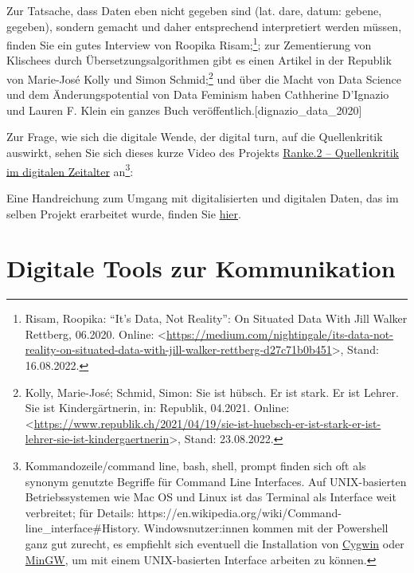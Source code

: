 \documentclass[
  letterpaper,
]{book}
\begin{document}
Zur Tatsache, dass Daten eben nicht gegeben sind (lat. dare, datum:
gebene, gegeben), sondern gemacht und daher entsprechend interpretiert
werden müssen, finden Sie ein gutes Interview von Roopika
Risam;\footnote{Risam, Roopika: {``}{It}{'}s {Data}, {Not}
  {Reality}{''}: {On} {Situated} {Data} {With} {Jill} {Walker}
  {Rettberg}, 06.2020. Online:
  \textless{}\url{https://medium.com/nightingale/its-data-not-reality-on-situated-data-with-jill-walker-rettberg-d27c71b0b451}\textgreater,
  Stand: 16.08.2022.}; zur Zementierung von Klischees durch
Übersetzungsalgorithmen gibt es einen Artikel in der Republik von
Marie-José Kolly und Simon Schmid;\footnote{Kolly, Marie-José; Schmid,
  Simon: Sie ist h{ü}bsch. {Er} ist stark. {Er} ist {Lehrer}. {Sie} ist
  {Kinderg{ä}rtnerin}, in: Republik, 04.2021. Online:
  \textless{}\url{https://www.republik.ch/2021/04/19/sie-ist-huebsch-er-ist-stark-er-ist-lehrer-sie-ist-kindergaertnerin}\textgreater,
  Stand: 23.08.2022.} und über die Macht von Data Science und dem
Änderungspotential von Data Feminism haben Cathherine D'Ignazio und
Lauren F. Klein ein ganzes Buch veröffentlich.{[}dignazio\_data\_2020{]}

Zur Frage, wie sich die digitale Wende, der digital turn, auf die
Quellenkritik auswirkt, sehen Sie sich dieses kurze Video des Projekts
\href{https://ranke2.uni.lu}{Ranke.2 -- Quellenkritik im digitalen
Zeitalter} an\footnote{Kommandozeile/command line, bash, shell, prompt
  finden sich oft als synonym genutzte Begriffe für Command Line
  Interfaces. Auf UNIX-basierten Betriebssystemen wie Mac OS und Linux
  ist das Terminal als Interface weit verbreitet; für Details:
  https://en.wikipedia.org/wiki/Command-line\_interface\#History.
  Windowsnutzer:innen kommen mit der Powershell ganz gut zurecht, es
  empfiehlt sich eventuell die Installation von
  \href{https://en.wikipedia.org/wiki/Cygwin}{Cygwin} oder
  \href{https://en.wikipedia.org/wiki/MinGW}{MinGW}, um mit einem
  UNIX-basierten Interface arbeiten zu können.}:

Eine Handreichung zum Umgang mit digitalisierten und digitalen Daten,
das im selben Projekt erarbeitet wurde, finden Sie
\href{_book/documents/Ranke_visual-aid.pdf}{hier}.

\hypertarget{digitale-tools-zur-kommunikation}{%
\section{Digitale Tools zur
Kommunikation}\label{digitale-tools-zur-kommunikation}}
\end{document}
